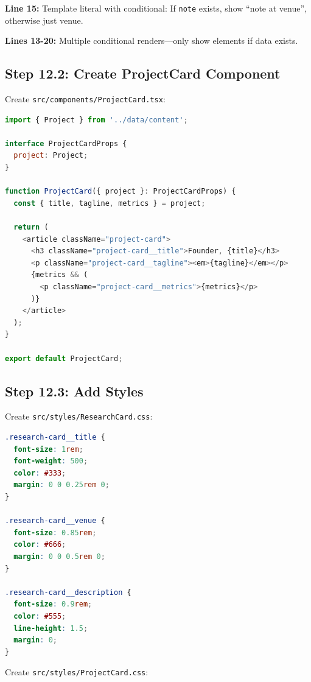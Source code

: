 \documentclass[12pt,a4paper]{article}
\begin{document}
\begin{explanation}
\textbf{Line 15:} Template literal with conditional: If \texttt{note} exists, show ``note at venue'', otherwise just venue.

\textbf{Lines 13-20:} Multiple conditional renders---only show elements if data exists.
\end{explanation}

\subsection{Step 12.2: Create ProjectCard Component}

Create \texttt{src/components/ProjectCard.tsx}:

\begin{lstlisting}[language=JavaScript,caption={src/components/ProjectCard.tsx}]
import { Project } from '../data/content';

interface ProjectCardProps {
  project: Project;
}

function ProjectCard({ project }: ProjectCardProps) {
  const { title, tagline, metrics } = project;

  return (
    <article className="project-card">
      <h3 className="project-card__title">Founder, {title}</h3>
      <p className="project-card__tagline"><em>{tagline}</em></p>
      {metrics && (
        <p className="project-card__metrics">{metrics}</p>
      )}
    </article>
  );
}

export default ProjectCard;
\end{lstlisting}

\subsection{Step 12.3: Add Styles}

Create \texttt{src/styles/ResearchCard.css}:

\begin{lstlisting}[language=CSS,caption={src/styles/ResearchCard.css}]
.research-card__title {
  font-size: 1rem;
  font-weight: 500;
  color: #333;
  margin: 0 0 0.25rem 0;
}

.research-card__venue {
  font-size: 0.85rem;
  color: #666;
  margin: 0 0 0.5rem 0;
}

.research-card__description {
  font-size: 0.9rem;
  color: #555;
  line-height: 1.5;
  margin: 0;
}
\end{lstlisting}

Create \texttt{src/styles/ProjectCard.css}:
\end{document}
